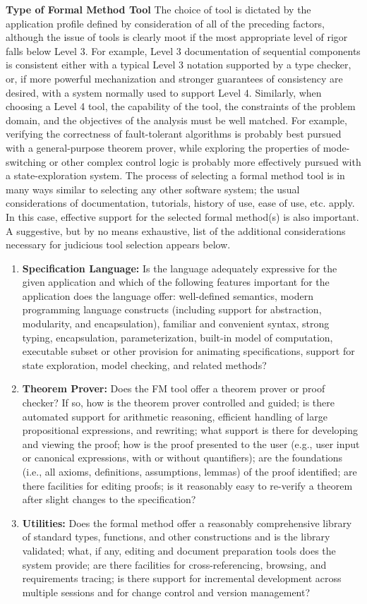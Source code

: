 \documentclass{template/openetcs_report}
\begin{document}
\textbf{Type of Formal Method Tool}
The choice of tool is dictated by the application profile defined by consideration of all of the preceding factors, although the issue of tools is clearly moot if the most appropriate level of rigor falls below Level 3. For example, Level 3 documentation of sequential components is consistent either with a typical Level 3 notation supported by a type checker, or, if more powerful mechanization and stronger guarantees of consistency are desired, with a system normally used to support Level 4. Similarly, when choosing a Level 4 tool, the capability of the tool, the constraints of the problem domain, and the objectives of the analysis must be well matched. For example, verifying the correctness of fault-tolerant algorithms is probably best pursued with a general-purpose theorem prover, while exploring the properties of mode-switching or other complex control logic is probably more effectively pursued with a state-exploration system.
The process of selecting a formal method tool is in many ways similar to selecting any other software system; the usual considerations of documentation, tutorials, history of use, ease of use, etc. apply. In this case, effective support for the selected formal method(s) is also important. A suggestive, but by no means exhaustive, list of the additional considerations necessary for judicious tool selection appears below. 
\begin{enumerate}\itemsep=0pt
  \item \textbf{Specification Language:} Is the language adequately expressive for the given application and which of the following features important for the application does the language offer: well-defined semantics, modern programming language constructs (including support for abstraction, modularity, and encapsulation), familiar and convenient syntax, strong typing, encapsulation, parameterization, built-in model of computation, executable subset or other provision for animating specifications, support for state exploration, model checking, and related methods?
  \item \textbf{Theorem Prover:} Does the FM tool offer a theorem prover or proof checker? If so, how is the theorem prover controlled and guided; is there automated support for arithmetic reasoning, efficient handling of large propositional expressions, and rewriting; what support is there for developing and viewing the proof; how is the proof presented to the user (e.g., user input or canonical expressions, with or without quantifiers); are the foundations (i.e., all axioms, definitions, assumptions, lemmas) of the proof identified; are there facilities for editing proofs; is it reasonably easy to re-verify a theorem after slight changes to the specification?
  \item \textbf{Utilities:} Does the formal method offer a reasonably comprehensive library of standard types, functions, and other constructions and is the library validated; what, if any, editing and document preparation tools does the system provide; are there facilities for cross-referencing, browsing, and requirements tracing; is there support for incremental development across multiple sessions and for change control and version management?
\end{enumerate}
\end{document}
